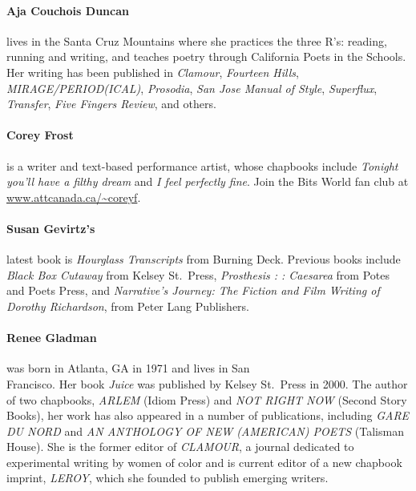 \documentclass[
]{memoir}
\begin{document}
\hypertarget{aja-couchois-duncan}{%
\paragraph{Aja Couchois Duncan}\label{aja-couchois-duncan}}

lives in the Santa Cruz Mountains where she practices the three R's:
reading, running and writing, and teaches poetry through California
Poets in the Schools. Her writing has been published in \emph{Clamour},
\emph{Fourteen Hills}, \emph{MIRAGE/PERIOD(ICAL)}, \emph{Prosodia},
\emph{San Jose Manual of Style}, \emph{Superflux}, \emph{Transfer},
\emph{Five Fingers Review}, and others.

\hypertarget{corey-frost}{%
\paragraph{Corey Frost}\label{corey-frost}}

is a writer and text-based performance artist, whose chapbooks include
\emph{Tonight you'll have a filthy dream} and \emph{I feel perfectly
fine}. Join the Bits World fan club at
\href{http://www.attcanada.ca/\%7Ecoreyf}{www.attcanada.ca/\textasciitilde{}coreyf}.

\hypertarget{susan-gevirtzs}{%
\paragraph{Susan Gevirtz's}\label{susan-gevirtzs}}

latest book is \emph{Hourglass Transcripts} from Burning Deck. Previous
books include \emph{Black Box Cutaway} from Kelsey St.~Press,
\emph{Prosthesis : : Caesarea} from Potes and Poets Press, and
\emph{Narrative's Journey: The Fiction and Film Writing of Dorothy
Richardson}, from Peter Lang Publishers.

\hypertarget{renee-gladman}{%
\paragraph{Renee Gladman}\label{renee-gladman}}

was born in Atlanta, GA in 1971 and lives in San\\
Francisco. Her book \emph{Juice} was published by Kelsey St.~Press in
2000. The author of two chapbooks, \emph{ARLEM} (Idiom Press) and
\emph{NOT RIGHT NOW} (Second Story Books), her work has also appeared in
a number of publications, including \emph{GARE DU NORD} and \emph{AN
ANTHOLOGY OF NEW (AMERICAN) POETS} (Talisman House). She is the former
editor of \emph{CLAMOUR}, a journal dedicated to experimental writing by
women of color and is current editor of a new chapbook imprint,
\emph{LEROY}, which she founded to publish emerging writers.
\end{document}
